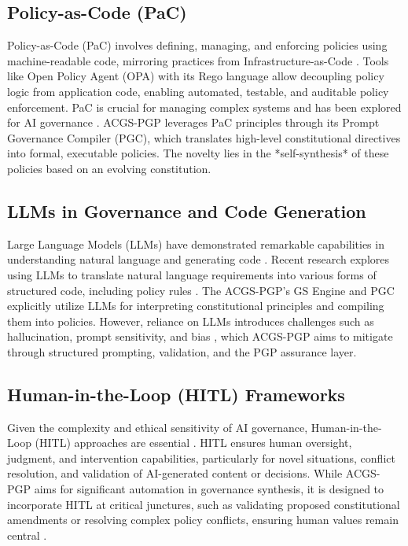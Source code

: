 \documentclass[sigconf,review,screen]{acmart}
\begin{document}
\subsection{Policy-as-Code (PaC)}
Policy-as-Code (PaC) involves defining, managing, and enforcing policies using machine-readable code, mirroring practices from Infrastructure-as-Code \cite{deboer2017policy}. Tools like Open Policy Agent (OPA) with its Rego language \cite{opa2021} allow decoupling policy logic from application code, enabling automated, testable, and auditable policy enforcement. PaC is crucial for managing complex systems and has been explored for AI governance \cite{principledevolution2024opa}. ACGS-PGP leverages PaC principles through its Prompt Governance Compiler (PGC), which translates high-level constitutional directives into formal, executable policies. The novelty lies in the *self-synthesis* of these policies based on an evolving constitution.

\subsection{LLMs in Governance and Code Generation}
Large Language Models (LLMs) have demonstrated remarkable capabilities in understanding natural language and generating code \cite{chen2021evaluating,brown2020language}. Recent research explores using LLMs to translate natural language requirements into various forms of structured code, including policy rules \cite{almulla2024emergence,li2024vericoder}. The ACGS-PGP's GS Engine and PGC explicitly utilize LLMs for interpreting constitutional principles and compiling them into policies. However, reliance on LLMs introduces challenges such as hallucination, prompt sensitivity, and bias \cite{ji2023survey}, which ACGS-PGP aims to mitigate through structured prompting, validation, and the PGP assurance layer.

\subsection{Human-in-the-Loop (HITL) Frameworks}
Given the complexity and ethical sensitivity of AI governance, Human-in-the-Loop (HITL) approaches are essential \cite{amershi2014power}. HITL ensures human oversight, judgment, and intervention capabilities, particularly for novel situations, conflict resolution, and validation of AI-generated content or decisions. While ACGS-PGP aims for significant automation in governance synthesis, it is designed to incorporate HITL at critical junctures, such as validating proposed constitutional amendments or resolving complex policy conflicts, ensuring human values remain central \cite{shneiderman2020human}.
\end{document}
